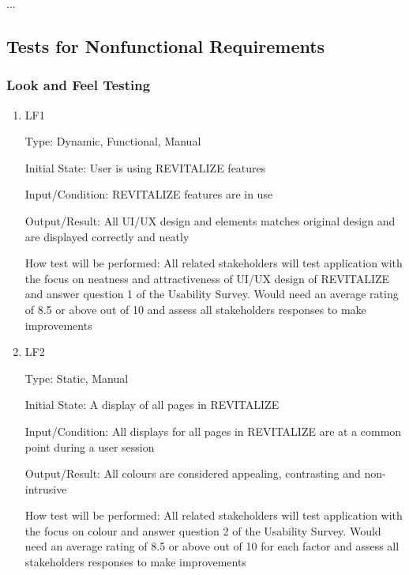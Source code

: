 \documentclass[12pt, titlepage]{article}
\begin{document}
...

\subsection{Tests for Nonfunctional Requirements}



\subsubsection{Look and Feel Testing}

\begin{enumerate}

\item{LF1\\}

Type: Dynamic, Functional, Manual
					
Initial State: User is using REVITALIZE features
					
Input/Condition: REVITALIZE features are in use
					
Output/Result: All UI/UX design and elements matches original design and are displayed correctly and neatly
					
How test will be performed: All related stakeholders will test application with the focus on neatness and attractiveness of UI/UX design of REVITALIZE and answer question 1 of the Usability Survey. Would need an average rating of 8.5 or above out of 10 and assess all stakeholders responses to make improvements
					
\item{LF2\\}

Type: Static, Manual
					
Initial State: A display of all pages in REVITALIZE
					
Input/Condition: All displays for all pages in REVITALIZE are at a common point during a user session
					
Output/Result: All colours are considered appealing, contrasting and non-intrusive
					
How test will be performed: All related stakeholders will test application with the focus on colour and answer question 2 of the Usability Survey. Would need an average rating of 8.5 or above out of 10 for each factor and assess all stakeholders responses to make improvements

\end{enumerate}
\end{document}
